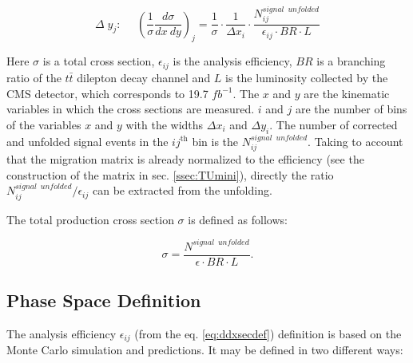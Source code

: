 \begin{equation}\label{eq:ddxsecdef}
 \Delta\;y_{j}: \:\:\:\:\:\:(\frac{1}{\sigma} \frac{d\sigma}{dx\:dy})_{j} = \frac{1}{\sigma} \cdot \frac{1}{\Delta x_{i}} \cdot \frac{N^{signal\:\;unfolded}_{ij}}{\epsilon_{ij} \cdot BR \cdot L}
\end{equation}

Here $\sigma$ is a total cross section, $\epsilon_{ij}$ is the analysis efficiency, $BR$ is a branching ratio of the $t\bar{t}$ dilepton decay channel and $L$ is the luminosity
collected by the CMS detector, which corresponds to 19.7 $fb^{-1}$. The $x$ and $y$ are the kinematic variables in which the cross sections 
are measured. $i$ and $j$ are the number of bins of the variables $x$ and $y$ with the widths $\Delta x_{i}$ and $\Delta y_{i}$.
The number of corrected and unfolded signal events in the $ij^{\textrm{th}}$ bin is the $N^{signal\:\;unfolded}_{ij}$.
Taking to account that the migration matrix is already normalized to the efficiency (see the construction of the matrix in sec. \ref{ssec:TUmini}), 
directly the ratio $N^{signal\:\;unfolded}_{ij} / \epsilon_{ij}$ can be extracted from the unfolding.

The total production cross section $\sigma$ is defined as follows:

\begin{equation}
 \sigma = \frac{N^{signal\;\:unfolded}}{\epsilon \cdot BR \cdot L}.
\end{equation}

\subsection{Phase Space Definition}

The analysis efficiency $\epsilon_{ij}$ (from the eq. \ref{eq:ddxsecdef}) definition is based on the Monte Carlo simulation and predictions.
It may be defined in two different ways:

